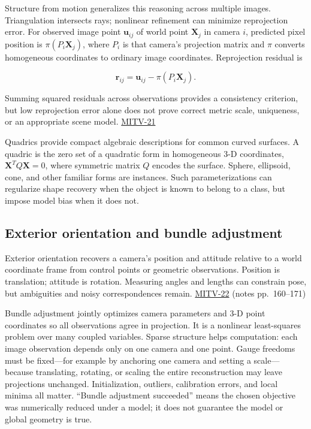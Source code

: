 Structure from motion generalizes this reasoning across multiple images. Triangulation intersects rays; nonlinear refinement can minimize reprojection error. For observed image point \(\mathbf{u}_{ij}\) of world point \(\mathbf{X}_j\) in camera \(i\), predicted pixel position is \(\pi(P_i\mathbf{X}_j)\), where \(P_i\) is that camera's projection matrix and \(\pi\) converts homogeneous coordinates to ordinary image coordinates. Reprojection residual is

\[
\mathbf{r}_{ij}=\mathbf{u}_{ij}-\pi(P_i\mathbf{X}_j).
\]

Summing squared residuals across observations provides a consistency criterion, but low reprojection error alone does not prove correct metric scale, uniqueness, or an appropriate scene model. \hyperref[04-visual-computing-ii-ch036-mitv-21---relative-orientation-binocular-stereo-structure-quadrics-calibration-reprojection]{MITV-21}

Quadrics provide compact algebraic descriptions for common curved surfaces. A quadric is the zero set of a quadratic form in homogeneous 3-D coordinates, \(\mathbf{X}^TQ\mathbf{X}=0\), where symmetric matrix \(Q\) encodes the surface. Sphere, ellipsoid, cone, and other familiar forms are instances. Such parameterizations can regularize shape recovery when the object is known to belong to a class, but impose model bias when it does not.

\subsection{Exterior orientation and bundle adjustment}\label{04-visual-computing-ii-ch032-exterior-orientation-and-bundle-adjustment}

Exterior orientation recovers a camera's position and attitude relative to a world coordinate frame from control points or geometric observations. Position is translation; attitude is rotation. Measuring angles and lengths can constrain pose, but ambiguities and noisy correspondences remain. \hyperref[04-visual-computing-ii-ch036-mitv-22---exterior-orientation-recovering-position-orientation-bundle-adjustment-object-shape]{MITV-22} (notes pp.~160--171)

Bundle adjustment jointly optimizes camera parameters and 3-D point coordinates so all observations agree in projection. It is a nonlinear least-squares problem over many coupled variables. Sparse structure helps computation: each image observation depends only on one camera and one point. Gauge freedoms must be fixed---for example by anchoring one camera and setting a scale---because translating, rotating, or scaling the entire reconstruction may leave projections unchanged. Initialization, outliers, calibration errors, and local minima all matter. ``Bundle adjustment succeeded'' means the chosen objective was numerically reduced under a model; it does not guarantee the model or global geometry is true.

